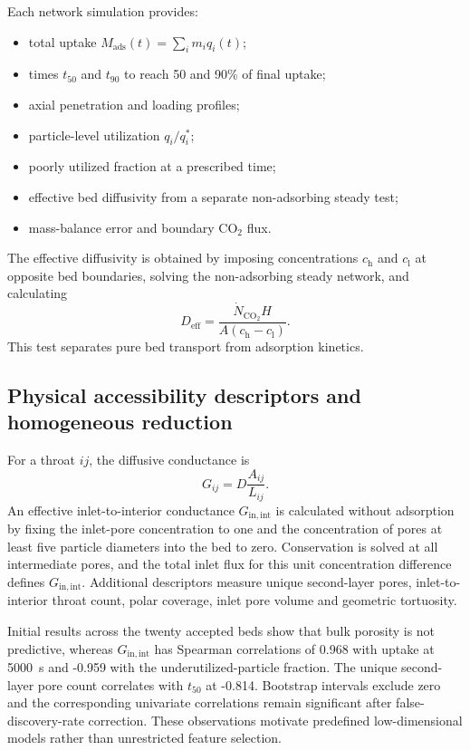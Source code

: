 \documentclass[12pt,a4paper]{article}
\begin{document}
Each network simulation provides:
\begin{itemize}
 \item total uptake $M_{\mathrm{ads}}(t)=\sum_i m_iq_i(t)$;
 \item times $t_{50}$ and $t_{90}$ to reach 50 and 90\% of final uptake;
 \item axial penetration and loading profiles;
 \item particle-level utilization $q_i/q_i^*$;
 \item poorly utilized fraction at a prescribed time;
 \item effective bed diffusivity from a separate non-adsorbing steady test;
 \item mass-balance error and boundary CO$_2$ flux.
\end{itemize}

The effective diffusivity is obtained by imposing concentrations $c_{\mathrm h}$
and $c_{\mathrm l}$ at opposite bed boundaries, solving the non-adsorbing steady
network, and calculating
\begin{equation}
 D_{\mathrm{eff}}=
 \frac{\dot N_{\mathrm{CO_2}}H}
 {A(c_{\mathrm h}-c_{\mathrm l})}.
 \label{eq:deff}
\end{equation}
This test separates pure bed transport from adsorption kinetics.

\subsection{Physical accessibility descriptors and homogeneous reduction}

For a throat $ij$, the diffusive conductance is
\begin{equation}
 G_{ij}=D\frac{A_{ij}}{L_{ij}}.
\end{equation}
An effective inlet-to-interior conductance $G_{\mathrm{in,int}}$ is calculated
without adsorption by fixing the inlet-pore concentration to one and the
concentration of pores at least five particle diameters into the bed to zero.
Conservation is solved at all intermediate pores, and the total inlet flux for
this unit concentration difference defines $G_{\mathrm{in,int}}$. Additional
descriptors measure unique second-layer pores, inlet-to-interior throat count,
polar coverage, inlet pore volume and geometric tortuosity.

Initial results across the twenty accepted beds show that bulk porosity is not
predictive, whereas $G_{\mathrm{in,int}}$ has Spearman correlations of 0.968
with uptake at 5000~s and -0.959 with the underutilized-particle fraction. The
unique second-layer pore count correlates with $t_{50}$ at -0.814. Bootstrap
intervals exclude zero and the corresponding univariate correlations remain
significant after false-discovery-rate correction. These observations motivate
predefined low-dimensional models rather than unrestricted feature selection.
\end{document}
